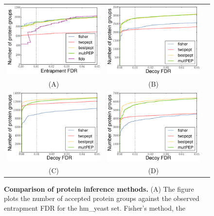 \documentclass{article}
\begin{document}
\begin{figure}
\centering
\begin{tabular}{ccc}
\includegraphics[width=0.45\linewidth]
{./img/unique-pept-performance-with-fido-exact} &
\includegraphics[width=0.45\linewidth]
{./img/wu-ipi-performance}\\
(A) & (B)\\
\includegraphics[width=0.45\linewidth]
{./img/kim-swissprot-performance} &
\includegraphics[width=0.45\linewidth]
{./img/kim-uniprot-performance}\\
(C) & (D)
\end{tabular}
  \caption{{\bf Comparison of protein inference methods.} (A) The
figure plots the number of accepted protein groups against the 
observed entrapment FDR for the hm\_yeast set. Fisher's method, the 
}
\end{figure}
\end{document}

